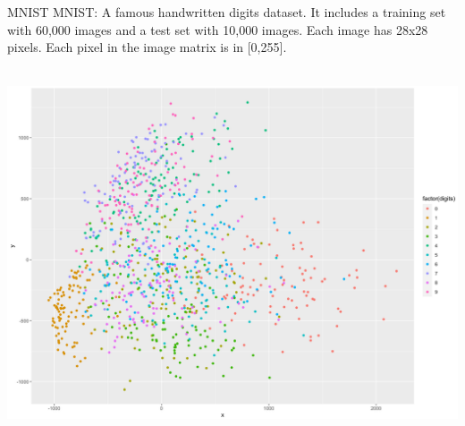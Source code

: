 \documentclass[10 pt]{beamer}
\begin{document}
\begin{frame}{MNIST}
MNIST: A famous handwritten digits dataset. It includes a training set with 60,000 images and a test set with 10,000 images. Each image has 28x28 pixels. Each pixel in the image matrix is in [0,255].\\
~\\
	\centerline{\includegraphics[scale=0.2]{figs/MNIST_mini.png}}
	~\\
\end{frame}
\end{document}
